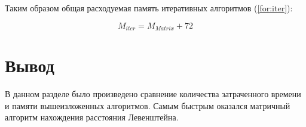 Таким образом общая расходуемая память итеративных алгоритмов (\ref{for:iter}):

\begin{equation}
M_{iter} = M_{Matrix} + 72
\label{for:iter}
\end{equation}


\section*{Вывод}

В данном разделе было произведено сравнение количества затраченного времени и памяти вышеизложенных алгоритмов. Самым быстрым оказался матричный алгоритм нахождения расстояния Левенштейна.